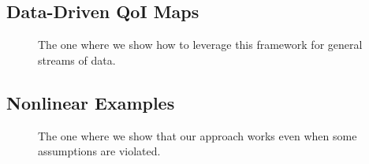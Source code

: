 \subsection{Data-Driven QoI Maps}

\begin{frame}[t]
\centering
\begin{figure}
\centering

The one where we show how to leverage this framework for general streams of data.

\end{figure}

\end{frame}


\subsection{Nonlinear Examples}

\begin{frame}[t]
\centering
\begin{figure}
\centering

The one where we show that our approach works even when some assumptions are violated.

\end{figure}

\end{frame}

